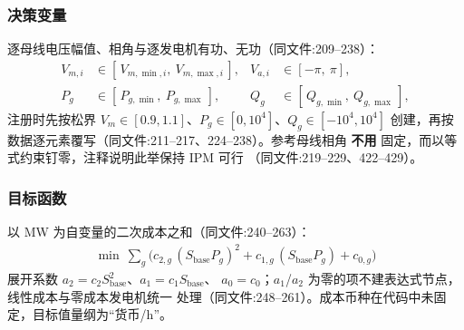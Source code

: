 \subsubsection*{决策变量}
逐母线电压幅值、相角与逐发电机有功、无功（同文件:209--238）：
\begin{align*}
V_{m,i} &\in [\,V_{m,\min,i},\ V_{m,\max,i}\,], &
V_{a,i} &\in [-\pi,\ \pi],\\
P_{g} &\in [\,P_{g,\min},\ P_{g,\max}\,], &
Q_{g} &\in [\,Q_{g,\min},\ Q_{g,\max}\,],
\end{align*}
注册时先按松界 $V_m\in[0.9,1.1]$、$P_g\in[0,10^{4}]$、$Q_g\in[-10^{4},10^{4}]$
创建，再按数据逐元素覆写（同文件:211--217、224--238）。参考母线相角
\textbf{不用}  固定，而以等式约束钉零，注释说明此举保持 IPM 可行
（同文件:219--229、422--429）。

\subsubsection*{目标函数}
以 MW 为自变量的二次成本之和（同文件:240--263）：
\begin{align*}
\min\ \sum_{g}\Big(c_{2,g}\,(S_{\mathrm{base}}P_g)^{2}
  + c_{1,g}\,(S_{\mathrm{base}}P_g) + c_{0,g}\Big)
\end{align*}
展开系数 $a_2=c_2 S_{\mathrm{base}}^{2}$、$a_1=c_1 S_{\mathrm{base}}$、
$a_0=c_0$；$a_1$/$a_2$ 为零的项不建表达式节点，线性成本与零成本发电机统一
处理（同文件:248--261）。成本币种在代码中未固定，目标值量纲为“货币/h”。

